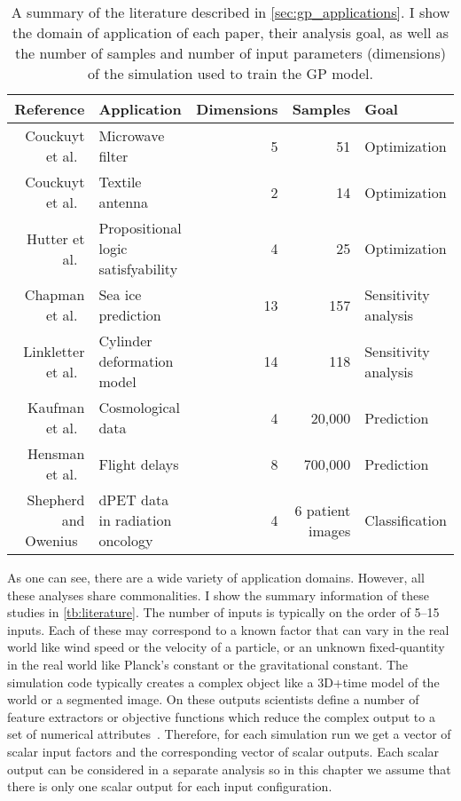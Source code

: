 \begin{table*}[htb]
\centering
\caption[A summary of the literature using Gaussian process models]{%
  A summary of the literature described in \autoref{sec:gp_applications}.  I
  show the domain of application of each paper, their analysis goal, as
  well as the number of samples and number of input parameters (dimensions)
  of the simulation used to train the GP model. 
}
\begin{tabular}{|r|lrrl|}
  \hline
  Reference & Application & Dimensions & Samples & Goal \\
  \hline
  Couckuyt et al.~\cite{Couckuyt:2010} & Microwave filter & 5 & 51 & Optimization \\
  Couckuyt et al.~\cite{Couckuyt:2010} & Textile antenna & 2 & 14 & Optimization \\
  Hutter et al.~\cite{Hutter:2010} & Propositional logic satisfyability & 4 & 25 & Optimization \\
  Chapman et al.~\cite{Chapman:1994} & Sea ice prediction & 13 & 157 & Sensitivity analysis \\
  Linkletter et al.~\cite{Linkletter:2006} & Cylinder deformation model & 14 & 118 & Sensitivity analysis \\
  Kaufman et al.~\cite{Kaufman:2011} & Cosmological data  & 4 & 20,000 & Prediction \\
  Hensman et al.~\cite{Hensman:2013} & Flight delays & 8 & 700,000 & Prediction \\
  Shepherd and Owenius~\cite{Shepherd:2012} & dPET data in radiation oncology & 4 & 6 patient images & Classification \\
  \hline
\end{tabular}
\label{tb:literature}
\end{table*}

As one can see, there are a wide variety of application domains.  However, 
all these analyses share commonalities.
I show the summary information of these studies in \autoref{tb:literature}.
The number of inputs is typically on
the order of 5--15 inputs. Each of these may correspond to a known factor that
can vary in the real world like wind speed or the velocity of a particle, or
an unknown fixed-quantity in the real world like Planck's constant or the
gravitational constant.  The simulation code typically creates a complex
object like a 3D+time model of the world or a segmented image. On these
outputs scientists define a number of feature extractors or objective
functions which reduce the complex output to a set of numerical 
attributes~\cite{Sedlmair:2014}.
Therefore, for each simulation run we get a vector of scalar input factors and
the corresponding vector of scalar outputs.  Each scalar output can be
considered in a separate analysis so in this chapter we assume that there is
only one scalar output for each input configuration.

